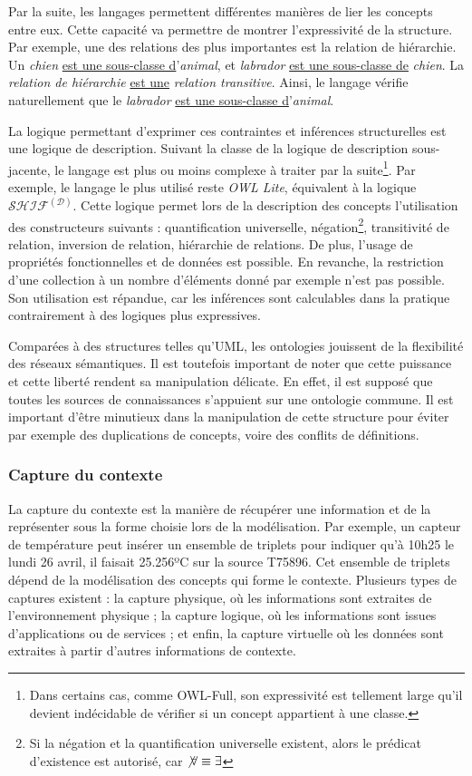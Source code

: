 Par la suite, les langages permettent différentes manières de lier les concepts entre eux. Cette capacité va permettre de montrer l'expressivité de la structure. Par exemple, une des relations des plus importantes est la relation de hiérarchie. Un \textit{chien} \underline{est une sous-classe d}'\textit{animal}, et \textit{labrador} \underline{est une sous-classe de} \textit{chien}. La \textit{relation de hiérarchie} \underline{est une} \textit{relation transitive}. Ainsi, le langage vérifie naturellement que le \textit{labrador} \underline{est une sous-classe d}'\textit{animal}. 

La logique permettant d'exprimer ces contraintes et inférences structurelles est une logique de description. Suivant la classe de la logique de description sous-jacente, le langage est plus ou moins complexe à traiter par la suite\footnote{Dans certains cas, comme OWL-Full, son expressivité est tellement large qu'il devient indécidable de vérifier si un concept appartient à une classe.}. Par exemple, le langage le plus utilisé reste \textit{OWL Lite}, équivalent à la logique $\mathcal{SHIF}^\mathcal{(D)}$. Cette logique permet lors de la description des concepts l'utilisation des constructeurs suivants : quantification universelle, négation\footnote{Si la négation et la quantification universelle existent, alors le prédicat d'existence est autorisé, car $\not\forall \equiv \exists$}, transitivité de relation, inversion de relation, hiérarchie de relations. De plus, l'usage de propriétés fonctionnelles et de données est possible. En revanche, la restriction d'une collection à un nombre d'éléments donné par exemple n'est pas possible. Son utilisation est répandue, car les inférences sont calculables dans la pratique contrairement à des logiques plus expressives.

Comparées à des structures telles qu'UML, les ontologies jouissent de la flexibilité des réseaux sémantiques. Il est toutefois important de noter que cette puissance et cette liberté rendent sa manipulation délicate. En effet, il est supposé que toutes les sources de connaissances s'appuient sur une ontologie commune. Il est important d'être minutieux dans la manipulation de cette structure pour éviter par exemple des duplications de concepts, voire des conflits de définitions.

\subsubsection{Capture du contexte}
La capture du contexte est la manière de récupérer une information et de la représenter sous la forme choisie lors de la modélisation. Par exemple, un capteur de température peut insérer un ensemble de triplets pour indiquer qu'à 10h25 le lundi 26 avril, il faisait 25.256ºC sur la source T75896. Cet ensemble de triplets dépend de la modélisation des concepts qui forme le contexte. Plusieurs types de captures existent : la capture physique, où les informations sont extraites de l'environnement physique ; la capture logique, où les informations sont issues d'applications ou de services ; et enfin, la capture virtuelle où les données sont extraites à partir d'autres informations de contexte.

